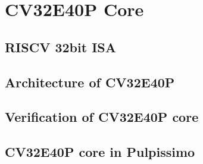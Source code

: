 \chapter{CV32E40P Core}{
	
	
	\section{RISCV 32bit ISA}{
		
	
	}%

	\section{Architecture of CV32E40P}{
	
	}%
	
	\section{Verification of CV32E40P core}{
		
	}%

	\section{CV32E40P core in Pulpissimo}{
		
	}%

}